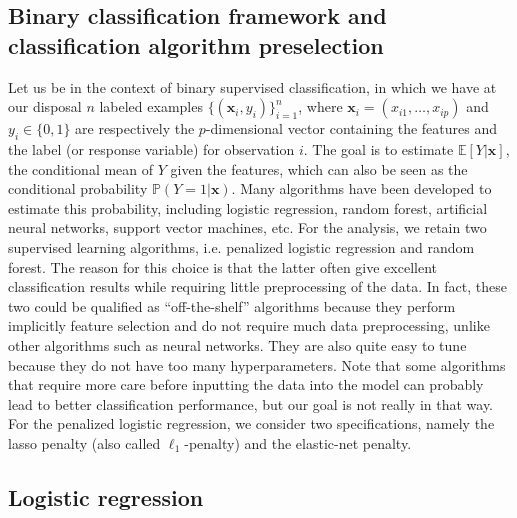 \documentclass{article}
\newcommand{\Esp}[1]{\mathbb{E}\! \left[ #1 \right]}
\newcommand{\Prr}[1]{\mathbb{P}\! \left( #1 \right)}
\begin{document}
\subsection{Binary classification framework and classification algorithm preselection}

Let us be in the context of binary supervised classification, in which we have at our disposal $n$ labeled examples $\{(\boldsymbol{x}_i, y_i)\}_{i = 1}^n$, where $\boldsymbol{x}_i = (x_{i1}, \dots, x_{ip})$ and $y_i \in \{0, 1\}$ are respectively the $p$-dimensional vector containing the features and the label (or response variable) for observation $i$. The goal is to estimate $\Esp{Y|\boldsymbol{x}}$, the conditional mean of $Y$ given the features, which can also be seen as the conditional probability $\Prr{Y = 1|\boldsymbol{x}}$. Many algorithms have been developed to estimate this probability, including logistic regression, random forest, artificial neural networks, support vector machines, etc. For the analysis, we retain two supervised learning algorithms, i.e. penalized logistic regression and random forest. The reason for this choice is that the latter often give excellent classification results while requiring little preprocessing of the data. In fact, these two could be qualified as ``off-the-shelf'' algorithms because they perform implicitly feature selection and do not require much data preprocessing, unlike other algorithms such as neural networks. They are also quite easy to tune because they do not have too many hyperparameters. Note that some algorithms that require more care before inputting the data into the model can probably lead to better classification performance, but our goal is not really in that way. For the penalized logistic regression, we consider two specifications, namely the lasso penalty (also called $\ell_1$-penalty) and the elastic-net penalty.

\subsection{Logistic regression}
\end{document}
